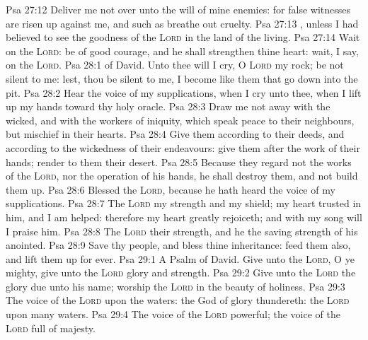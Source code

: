\vs Psa 27:12 Deliver me not over unto the will of mine enemies: for false witnesses are risen up against me, and such as breathe out cruelty.
\vs Psa 27:13 , unless I had believed to see the goodness of the \textsc{Lord} in the land of the living.
\vs Psa 27:14 Wait on the \textsc{Lord}: be of good courage, and he shall strengthen thine heart: wait, I say, on the \textsc{Lord}.
\vs Psa 28:1  of David. Unto thee will I cry, O \textsc{Lord} my rock; be not silent to me: lest,  thou be silent to me, I become like them that go down into the pit.
\vs Psa 28:2 Hear the voice of my supplications, when I cry unto thee, when I lift up my hands toward thy holy oracle.
\vs Psa 28:3 Draw me not away with the wicked, and with the workers of iniquity, which speak peace to their neighbours, but mischief  in their hearts.
\vs Psa 28:4 Give them according to their deeds, and according to the wickedness of their endeavours: give them after the work of their hands; render to them their desert.
\vs Psa 28:5 Because they regard not the works of the \textsc{Lord}, nor the operation of his hands, he shall destroy them, and not build them up.
\vs Psa 28:6 Blessed  the \textsc{Lord}, because he hath heard the voice of my supplications.
\vs Psa 28:7 The \textsc{Lord}  my strength and my shield; my heart trusted in him, and I am helped: therefore my heart greatly rejoiceth; and with my song will I praise him.
\vs Psa 28:8 The \textsc{Lord}  their strength, and he  the saving strength of his anointed.
\vs Psa 28:9 Save thy people, and bless thine inheritance: feed them also, and lift them up for ever.
\vs Psa 29:1 A Psalm of David. Give unto the \textsc{Lord}, O ye mighty, give unto the \textsc{Lord} glory and strength.
\vs Psa 29:2 Give unto the \textsc{Lord} the glory due unto his name; worship the \textsc{Lord} in the beauty of holiness.
\vs Psa 29:3 The voice of the \textsc{Lord}  upon the waters: the God of glory thundereth: the \textsc{Lord}  upon many waters.
\vs Psa 29:4 The voice of the \textsc{Lord}  powerful; the voice of the \textsc{Lord}  full of majesty.
